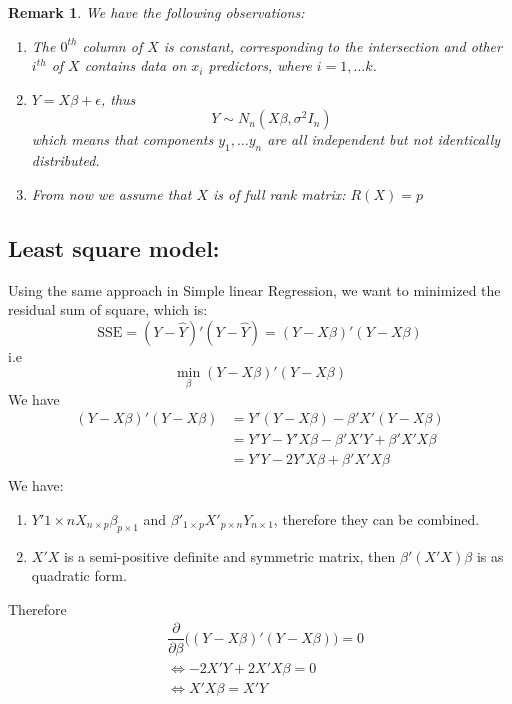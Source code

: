 \documentclass[11pt]{article}
\newtheorem{remark}{Remark}[subsection]
\begin{document}
\begin{remark} We have the following observations:
	\begin{enumerate}
		\item The $0^{th}$ column of $X$ is constant, corresponding to the intersection and other $i^{th}$ of $X$ contains data on $x_i$ predictors, where $i = 1, \dots k$.
		\item $ Y = X\beta + \epsilon$, thus
		$$Y \sim N_n (X\beta, \sigma^2 I_n) $$ which means that components $y_1, \dots y_n$ are all independent but not identically distributed.
		\item From now we assume that $X$ is of full rank matrix: $R(X) = p$
	\end{enumerate}
\end{remark}

\subsection{Least square model: }
Using the same approach in Simple linear Regression, we want to minimized the residual sum of square, which is:
$$\text{SSE} = (Y - \hat{Y})'(Y - \hat{Y}) = (Y - X\beta)'(Y - X\beta) $$
i.e 
\begin{equation}\label{eq: mini-beta}
	\min_{\beta}  (Y - X\beta)'(Y - X\beta) 
\end{equation}
We have 
\begin{align*}
	(Y - X\beta)'(Y - X\beta) &= Y'(Y - X\beta) - \beta'X'(Y - X\beta) \\
	&  =Y'Y - Y'X\beta - \beta'X'Y + \beta' X'X \beta \\
	& = Y'Y - 2 Y'X \beta + \beta'X'X \beta\\
\end{align*}
We have:\\
\begin{enumerate}
	\item $Y'{1 \times n} X_{ n \times p} \beta_{p \times 1}$ and $\beta'_{1 \times p} X'_{p \times n} Y_{n \times 1}$, therefore they can be combined.
	\item $X'X$ is a semi-positive definite and symmetric matrix, then $\beta'(X'X) \beta$ is as quadratic form.
\end{enumerate}
Therefore 
\begin{align*}
	& \dfrac{\partial }{\partial \beta} \big( (Y - X\beta)'(Y - X\beta) \big)  =  0 \\
	& \Leftrightarrow - 2X'Y + 2 X'X \beta  = 0 \\
	& \Leftrightarrow X'X \beta = X'Y
\end{align*}
\end{document}
